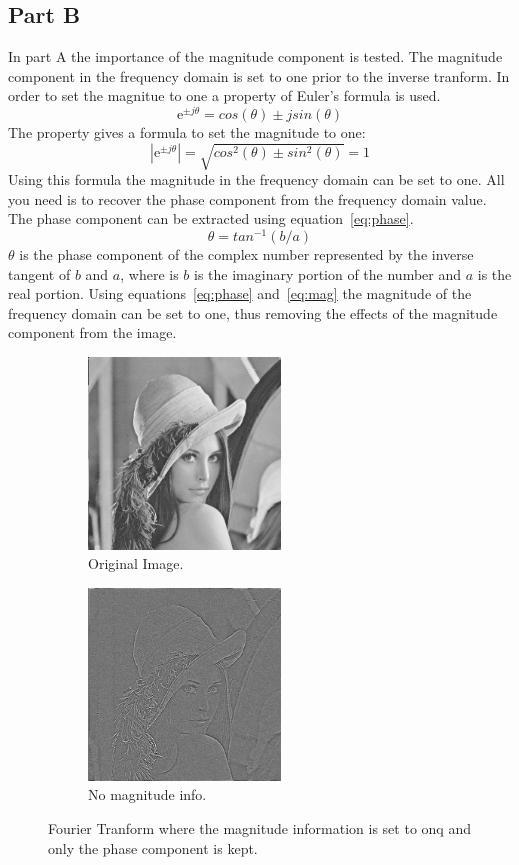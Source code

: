 \documentclass[letter]{article}
\begin{document}
\subsection{Part B}
In part A the importance of the magnitude component is tested. The magnitude component in the frequency domain is set to one prior to the inverse tranform. In order to set the magnitue to one a property of Euler's formula is used.
\begin{equation}
\mathrm{e}^{\pm j\theta} = cos(\theta) \pm j sin(\theta)
\end{equation}
The property gives a formula to set the magnitude to one:
\begin{equation}
|\mathrm{e}^{\pm j\theta}| = \sqrt{cos^{2}(\theta) \pm sin^{2}(\theta)} = 1
\label{eq:mag}
\end{equation}
Using this formula the magnitude in the frequency domain can be set to one. All you need is to recover the phase component from the frequency domain value. The phase component can be extracted using equation~\ref{eq:phase}.
\begin{equation}
 \theta = tan^{-1}(b/a)
 \label{eq:phase}
\end{equation}
$\theta$ is the phase component of the complex number represented by the inverse tangent of $b$ and $a$, where is $b$ is the imaginary portion of the number and $a$ is the real portion. Using equations~\ref{eq:phase} and~\ref{eq:mag} the magnitude of the frequency domain can be set to one, thus removing the effects of the magnitude component from the image.



\begin{figure}[hbtp]
  \centering
  \begin{subfigure}{5.1cm}
    \includegraphics[width=5.1cm]{images/lenna.png}
    \caption{Original Image.}
  \end{subfigure}
  \begin{subfigure}{5.1cm}
    \includegraphics[width=5.1cm]{images/lenna_phase_only.png}
    \caption{No magnitude info.}
  \end{subfigure}
  \caption{Fourier Tranform where the magnitude information is set to onq and only the phase component is kept.}
  \label{fig:ft_phase}
\end{figure}
\end{document}
